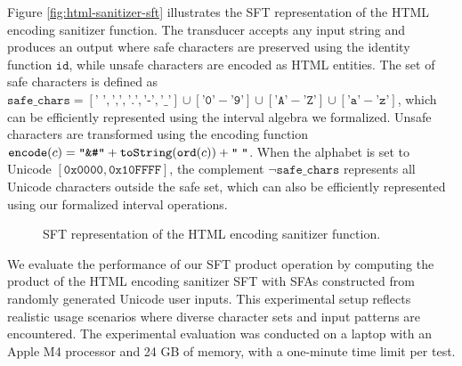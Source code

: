 Figure \ref{fig:html-sanitizer-sft} illustrates the SFT representation of the HTML encoding sanitizer function. The transducer accepts any input string and produces an output where safe characters are preserved using the identity function $\texttt{id}$, while unsafe characters are encoded as HTML entities. The set of safe characters is defined as $\texttt{safe\_chars} = [\texttt{' '}, \texttt{','}, \texttt{'.'}, \texttt{'-'}, \texttt{'\_'}] \cup [\texttt{'0'}-\texttt{'9'}] \cup [\texttt{'A'}-\texttt{'Z'}] \cup [\texttt{'a'}-\texttt{'z'}]$, which can be efficiently represented using the interval algebra we formalized. Unsafe characters are transformed using the encoding function $\texttt{encode}(c) = \texttt{``\&\#''} + \texttt{toString}(\texttt{ord}(c)) + \texttt{``\;''}$. When the alphabet is set to Unicode $[\mathtt{0x0000}, \mathtt{0x10FFFF}]$, the complement $\neg\texttt{safe\_chars}$ represents all Unicode characters outside the safe set, which can also be efficiently represented using our formalized interval operations.
\begin{figure}[htbp]
\centering
{}
\caption{SFT representation of the HTML encoding sanitizer function.}
\label{fig:html-sanitizer-sft1}
\end{figure}

We evaluate the performance of our SFT product operation by computing the product of the HTML encoding sanitizer SFT with SFAs constructed from randomly generated Unicode user inputs. This experimental setup reflects realistic usage scenarios where diverse character sets and input patterns are encountered. The experimental evaluation was conducted on a laptop with an Apple M4 processor and 24 GB of memory, with a one-minute time limit per test.

